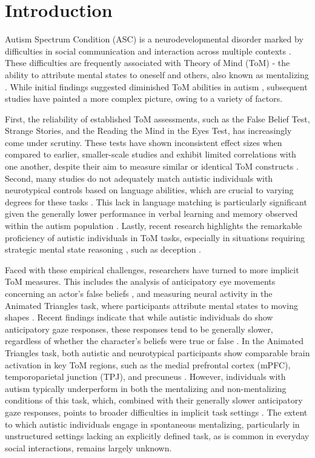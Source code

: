 \thispagestyle{empty}

\newpage

\section*{Introduction}
Autism Spectrum Condition (ASC) is a neurodevelopmental disorder marked by difficulties in social communication and interaction across multiple contexts \citep{apa2013}. These difficulties are frequently associated with Theory of Mind (ToM) - the ability to attribute mental states to oneself and others, also known as mentalizing \citep{premack1978,wimmer1983}. While initial findings suggested diminished ToM abilities in autism \citep{baron-cohen1985,happe1994}, subsequent studies have painted a more complex picture, owing to a variety of factors. 

First, the reliability of established ToM assessments, such as the False Belief Test, Strange Stories, and the Reading the Mind in the Eyes Test, has increasingly come under scrutiny. These tests have shown inconsistent effect sizes when compared to earlier, smaller-scale studies and exhibit limited correlations with one another, despite their aim to measure similar or identical ToM constructs \citep{gernsbacher2019,higgins2024,schaafsma2015,yeung2024}. Second, many studies do not adequately match autistic individuals with neurotypical controls based on language abilities, which are crucial to varying degrees for these tasks \citep{betz2019}. This lack in language matching is particularly significant given the generally lower performance in verbal learning and memory observed within the autism population \citep{velikonja2019}. Lastly, recent research highlights the remarkable proficiency of autistic individuals in ToM tasks, especially in situations requiring strategic mental state reasoning \citep{bowler1992,pantelis2017}, such as deception \citep{vantiel2021}.

Faced with these empirical challenges, researchers have turned to more implicit ToM measures. This includes the analysis of anticipatory eye movements concerning an actor's false beliefs \citep{senju2009}, and measuring neural activity in the Animated Triangles task, where participants attribute mental states to moving shapes \citep{abell2000}. Recent findings indicate that while autistic individuals do show anticipatory gaze responses, these responses tend to be generally slower, regardless of whether the character's beliefs were true or false \citep{glenwright2021,schuwerk2016}. In the Animated Triangles task, both autistic and neurotypical participants show comparable brain activation in key ToM regions, such as the medial prefrontal cortex (mPFC), temporoparietal junction (TPJ), and precuneus \citep{moessnang2020}. However, individuals with autism typically underperform in both the mentalizing and non-mentalizing conditions of this task, which, combined with their generally slower anticipatory gaze responses, points to broader difficulties in implicit task settings \citep{wilson2021}. The extent to which autistic individuals engage in spontaneous mentalizing, particularly in unstructured settings lacking an explicitly defined task, as is common in everyday social interactions, remains largely unknown.

